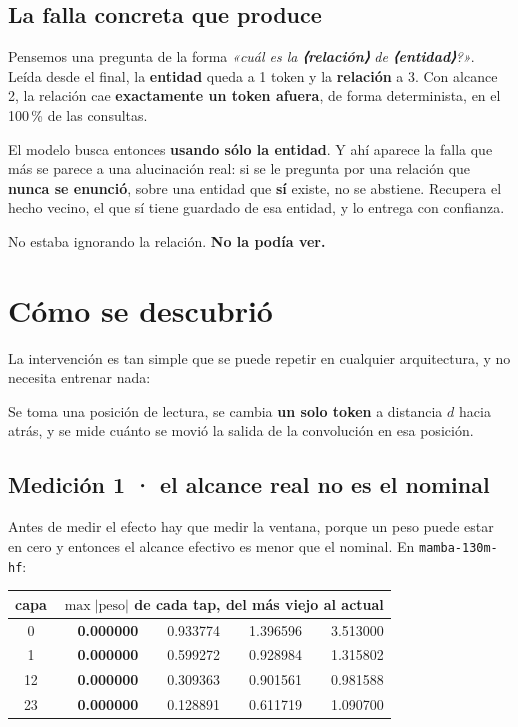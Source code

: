 \documentclass[11pt,a4paper]{article}
\begin{document}
\subsection*{La falla concreta que produce}

Pensemos una pregunta de la forma \emph{«cuál es la \textbf{⟨relación⟩} de \textbf{⟨entidad⟩}?»}.
Leída desde el final, la \textbf{entidad} queda a 1 token y la \textbf{relación} a 3. Con alcance 2,
la relación cae \textbf{exactamente un token afuera}, de forma determinista, en el 100\,\% de las
consultas.

El modelo busca entonces \textbf{usando sólo la entidad}. Y ahí aparece la falla que más se parece a
una alucinación real: si se le pregunta por una relación que \textbf{nunca se enunció}, sobre una
entidad que \textbf{sí} existe, no se abstiene. Recupera el hecho vecino, el que sí tiene guardado de
esa entidad, y lo entrega con confianza.

No estaba ignorando la relación. \textbf{No la podía ver.}

\section{Cómo se descubrió}

La intervención es tan simple que se puede repetir en cualquier arquitectura, y no necesita entrenar
nada:

\begin{center}
\end{center}

Se toma una posición de lectura, se cambia \textbf{un solo token} a distancia $d$ hacia atrás, y se
mide cuánto se movió la salida de la convolución en esa posición.

\subsection*{Medición 1 · el alcance real no es el nominal}

Antes de medir el efecto hay que medir la ventana, porque un peso puede estar en cero y entonces el
alcance efectivo es menor que el nominal. En \texttt{mamba-130m-hf}:

\begin{center}
\begin{tabular}{crrrr}
\toprule
capa & \multicolumn{4}{c}{$\max|\text{peso}|$ de cada tap, del más viejo al actual} \\
\midrule
0  & \textbf{0.000000} & 0.933774 & 1.396596 & 3.513000 \\
1  & \textbf{0.000000} & 0.599272 & 0.928984 & 1.315802 \\
12 & \textbf{0.000000} & 0.309363 & 0.901561 & 0.981588 \\
23 & \textbf{0.000000} & 0.128891 & 0.611719 & 1.090700 \\
\bottomrule
\end{tabular}
\end{center}
\end{document}
